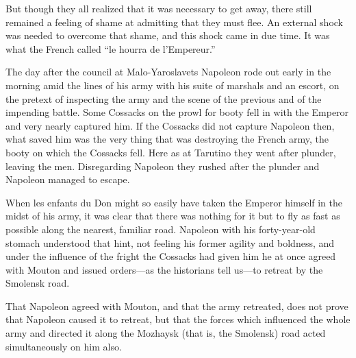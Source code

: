 But though they all realized that it was necessary to get away,
there still remained a feeling of shame at admitting that they
must flee. An external shock was needed to overcome that shame,
and this shock came in due time. It was what the French called
``le hourra de l'Empereur.''

The day after the council at Malo-Yaroslavets Napoleon rode out
early in the morning amid the lines of his army with his suite of
marshals and an escort, on the pretext of inspecting the army and
the scene of the previous and of the impending battle. Some
Cossacks on the prowl for booty fell in with the Emperor and very
nearly captured him. If the Cossacks did not capture Napoleon
then, what saved him was the very thing that was destroying the
French army, the booty on which the Cossacks fell. Here as at
Tarutino they went after plunder, leaving the men. Disregarding
Napoleon they rushed after the plunder and Napoleon managed to
escape.

When les enfants du Don might so easily have taken the Emperor
himself in the midst of his army, it was clear that there was
nothing for it but to fly as fast as possible along the nearest,
familiar road. Napoleon with his forty-year-old stomach
understood that hint, not feeling his former agility and
boldness, and under the influence of the fright the Cossacks had
given him he at once agreed with Mouton and issued orders---as
the historians tell us---to retreat by the Smolensk road.

That Napoleon agreed with Mouton, and that the army retreated,
does not prove that Napoleon caused it to retreat, but that the
forces which influenced the whole army and directed it along the
Mozhaysk (that is, the Smolensk) road acted simultaneously on him
also.



